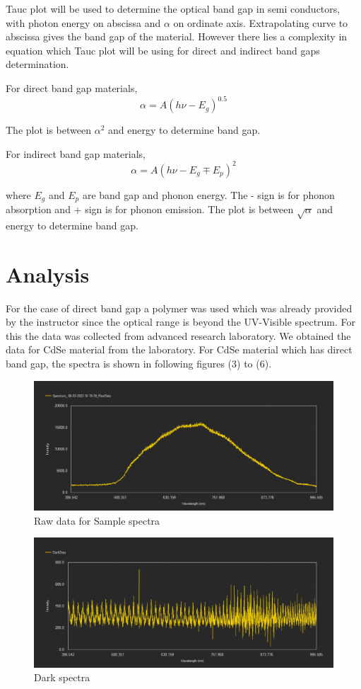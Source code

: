 \documentclass[a4paper, amsfonts, amssymb, amsmath, reprint, showkeys, nofootinbib, twoside]{revtex4-1}
\begin{document}
Tauc plot will be used to determine the optical band gap in semi conductors, with photon energy on abscissa and $\alpha$ on ordinate axis. Extrapolating curve to abscissa gives the band gap of the material. However there lies a complexity in equation which Tauc plot will be using for direct and indirect band gaps determination.

For direct band gap materials,
\begin{equation}
	\alpha=A(h\nu-E_g)^{0.5}
\end{equation}

The plot is between $\alpha^2$ and energy to determine band gap.

For indirect band gap materials, 
\begin{equation}
	\alpha=A(h\nu-E_g\mp E_p)^{2}
\end{equation}

where $E_g$ and $E_p$ are band gap and phonon energy. The - sign is for phonon absorption and + sign is for phonon emission. The plot is between $\sqrt{\alpha}$ and energy to determine band gap. 

\section{Analysis}
For the case of direct band gap a polymer was used which was already provided by the instructor since the optical range is beyond the UV-Visible spectrum. For this the data was collected from advanced research laboratory. We obtained the data for CdSe material from the laboratory. For CdSe material which has direct band gap, the spectra is shown in following figures (3) to (6). 

\begin{figure}[H]
	\centering
	\includegraphics[scale=0.3]{Sample}
	\caption{Raw data for Sample spectra}
	\label{3}
\end{figure}

\begin{figure}[H]
	\centering
	\includegraphics[scale=0.3]{Dark}
	\caption{Dark spectra}
	\label{4}
\end{figure}
\end{document}

